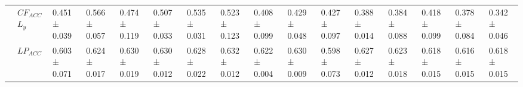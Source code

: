 \begin{tabular}{llllllllllllllll}
                       & $CF_{ACC}$ $L_y$ &  0.451 ± 0.039 &  0.566 ± 0.057 &  0.474 ± 0.119 &  0.507 ± 0.033 &  0.535 ± 0.031 &  0.523 ± 0.123 &  0.408 ± 0.099 &  0.429 ± 0.048 &  0.427 ± 0.097 &  0.388 ± 0.014 &  0.384 ± 0.088 &  0.418 ± 0.099 &  0.378 ± 0.084 &  0.342 ± 0.046 \\
                       & $LP_{ACC}$ &  0.603 ± 0.071 &  0.624 ± 0.017 &  0.630 ± 0.019 &  0.630 ± 0.012 &  0.628 ± 0.022 &  0.632 ± 0.012 &  0.622 ± 0.004 &  0.630 ± 0.009 &  0.598 ± 0.073 &  0.627 ± 0.012 &  0.623 ± 0.018 &  0.618 ± 0.015 &  0.616 ± 0.015 &  0.618 ± 0.015 \\
\bottomrule
\end{tabular}
